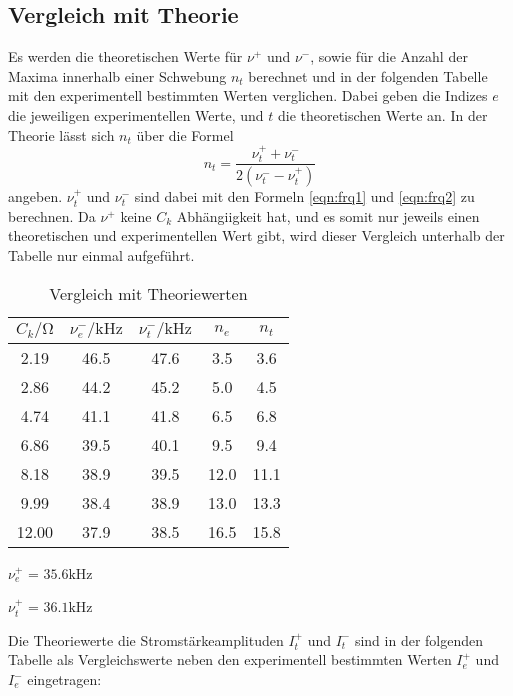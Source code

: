 \subsection{Vergleich mit Theorie}
Es werden die theoretischen Werte für $\nu^+$ und $\nu^-$, sowie für die Anzahl der Maxima innerhalb einer Schwebung $n_t$
berechnet und in der folgenden Tabelle mit den experimentell bestimmten Werten verglichen. Dabei geben die Indizes $e$ die jeweiligen
experimentellen Werte, und $t$ die theoretischen Werte an. 
In der Theorie lässt sich $n_t$ über die Formel \begin{equation}
    n_t = \frac{\nu_{t}^{+} + \nu_{t}^{-}}{2(\nu_{t}^{-} - \nu_{t}^{+})}
\end{equation}
angeben. $\nu_{t}^{+}$ und $\nu_{t}^{-}$ sind dabei mit den Formeln \ref{eqn:frq1} und \ref{eqn:frq2} zu berechnen.
Da $\nu^+$ keine $C_k$ Abhängiigkeit hat, und es somit nur jeweils einen theoretischen und experimentellen Wert gibt, wird
dieser Vergleich unterhalb der Tabelle nur einmal aufgeführt.
\begin{table}
    \centering
    \caption{Vergleich mit Theoriewerten}
    \label{tab:theo}
    \begin{tabular}{c c c c c}
    \toprule
    $C_k / \si{\ohm}$ & $\nu_{e}^- / \si{\kilo\hertz}$ & $\nu_{t}^- / \si{\kilo\hertz}$ & $n_e$ & $n_t$ \\
    \midrule
     2.19 & 46.5 & 47.6 &  3.5 &  3.6 \\
     2.86 & 44.2 & 45.2 &  5.0 &  4.5 \\
     4.74 & 41.1 & 41.8 &  6.5 &  6.8 \\
     6.86 & 39.5 & 40.1 &  9.5 &  9.4 \\
     8.18 & 38.9 & 39.5 & 12.0 & 11.1 \\
     9.99 & 38.4 & 38.9 & 13.0 & 13.3 \\
    12.00 & 37.9 & 38.5 & 16.5 & 15.8 \\
    \bottomrule
    \end{tabular}
\end{table}

$\nu_e^+$ = $35.6 \si{\kilo\hertz}$

$\nu_t^+$ = $36.1 \si{\kilo\hertz}$

Die Theoriewerte die Stromstärkeamplituden $I_t^+$ und $I_t^-$ sind in der folgenden Tabelle als Vergleichswerte
neben den experimentell bestimmten Werten $I_e^+$ und $I_e^-$ eingetragen: 

